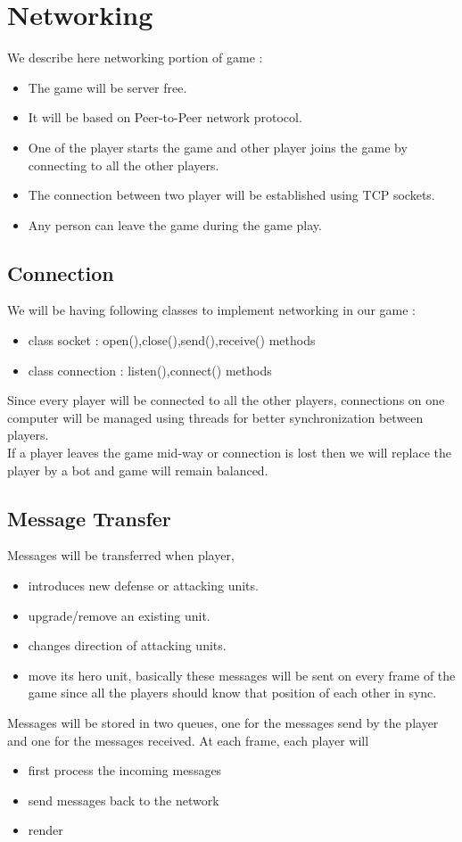 \documentclass{article}
\begin{document}
\section{Networking}
We describe here networking portion of game :
\begin{itemize}
\item The game will be server free.
\item It will be based on Peer-to-Peer network protocol.
\item One of the player starts the game and other player joins the game by connecting to all the other players.
\item The connection between two player will be established using TCP sockets.
\item Any person can leave the game during the game play.
\end{itemize}

\subsection{Connection}
We will be having following classes to implement networking in our game :
\begin{itemize}
\item class socket : open(),close(),send(),receive() methods
\item class connection : listen(),connect() methods
\end{itemize}
Since every player will be connected to all the other players, connections on one computer will be managed using threads for better synchronization between players.\\
If a player leaves the game mid-way or connection is lost then we will replace the player by a bot and game will remain balanced.

\subsection{Message Transfer}
Messages will be transferred when player,
\begin{itemize}
\item introduces new defense or attacking units.
\item upgrade/remove an existing unit.
\item changes direction of attacking units.
\item move its hero unit, basically these messages will be sent on every frame of the game since all the players should know that position of each other in sync.

\end{itemize}
Messages will be stored in two queues, one for the messages send by the player and one for the messages received. At each frame, each player will
\begin{itemize}
\item first process the incoming messages
\item send messages back to the network
\item render
\end{itemize}
\end{document}
